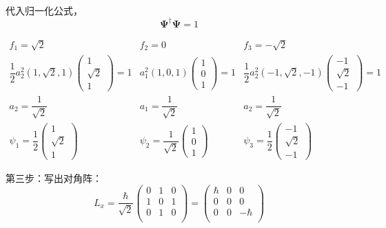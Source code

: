 \begin{frame} 
    代入归一化公式， $$ \pmb {\Psi} ^{\dagger } \pmb {\Psi} =1 $$

    $$\begin{matrix}
    f_1=\sqrt{2} & f_2=0  &  f_3=-\sqrt{2}\\
    \dfrac{1}{2} a_2 ^2 (1, \sqrt{2}, 1)
    \begin{pmatrix}
    1\\
    {\sqrt{2}}\\
    1
    \end{pmatrix} 
    =1 
    & 
    a_1 ^2 (1, 0, 1)
    \begin{pmatrix}
     1\\
     0\\
     1
    \end{pmatrix} 
    =1 
     &
     \dfrac{1}{2} a_2 ^2 (-1, \sqrt{2}, -1)
    \begin{pmatrix}
     -1\\
     {\sqrt{2}}\\
     -1
    \end{pmatrix} 
    =1 \\
    a_2= \dfrac{1}{\sqrt{2}} &  a_1= \dfrac{1}{\sqrt{2}} &   a_2=\dfrac{1}{\sqrt{2}} 
    \\
    \psi_1=\dfrac{1}{2}
    \begin{pmatrix}
    1\\
    \sqrt{2}\\
    1
    \end{pmatrix}  
    & 
    \psi_2=\dfrac{1}{\sqrt{2}}
    \begin{pmatrix}
    1\\
    0\\
    1
    \end{pmatrix}  
    &
    \psi_3=\dfrac{1}{2}
    \begin{pmatrix}
    -1\\
    \sqrt{2}\\
    -1
    \end{pmatrix}  
    \end{matrix}$$   
\end{frame}

\begin{frame} 
    第三步：写出对角阵：
    $$ L_x= \frac{\hbar}{\sqrt{2}}
        \begin{pmatrix}
            0 & 1 & 0  \\
            1 & 0 & 1  \\
            0 & 1 & 0 \\
         \end{pmatrix} 
    = 
    \begin{pmatrix}
        \hbar & 0 & 0  \\
        0 & 0 &   0\\
        0 & 0 & -\hbar \\
     \end{pmatrix} 
    $$
\end{frame}

